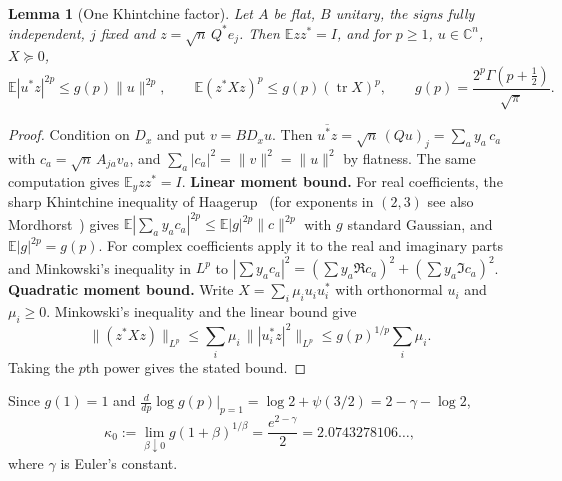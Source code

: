 \documentclass[11pt,a4paper]{article}
\newtheorem{lemma}[theorem]{Lemma}
\theoremstyle{definition}
\theoremstyle{remark}
\numberwithin{equation}{section}
\newcommand{\E}{\mathbb E}
\newcommand{\C}{\mathbb C}
\newcommand{\tr}{\operatorname{tr}}
\newcommand{\norm}[1]{\lVert#1\rVert}
\begin{document}
\begin{lemma}[One Khintchine factor]\label{lem:row}
Let $A$ be flat, $B$ unitary, the signs fully independent, $j$ fixed and
$z=\sqrt n\,Q^*e_j$. Then $\E zz^*=I$, and for $p\ge1$, $u\in\C^n$, $X\succeq0$,
\[
 \E|u^*z|^{2p}\le g(p)\norm u^{2p},\qquad \E(z^*Xz)^p\le g(p)(\tr X)^p,\qquad
 g(p)=\frac{2^p\Gamma(p+\frac12)}{\sqrt\pi}.
\]
\end{lemma}
\begin{proof}
Condition on $D_x$ and put $v=BD_xu$. Then
$\overline{u^*z}=\sqrt n\,(Qu)_j=\sum_a y_a\,c_a$ with $c_a=\sqrt n\,A_{ja}v_a$,
and $\sum_a|c_a|^2=\norm v^2=\norm u^2$ by flatness. The
same computation gives $\E_yzz^*=I$. \noindent\textbf{Linear moment bound.}\enspace
For real coefficients, the sharp
Khintchine inequality of Haagerup~\cite{Haagerup} (for exponents in $(2,3)$ see
also Mordhorst~\cite{Mordhorst}) gives
$\E|\sum_ay_ac_a|^{2p}\le\E|g|^{2p}\norm c^{2p}$ with $g$ standard Gaussian, and
$\E|g|^{2p}=g(p)$. For complex coefficients apply it to the real and imaginary
parts and Minkowski's inequality in $L^p$ to
$|\sum y_ac_a|^2=(\sum y_a\Re c_a)^2+(\sum y_a\Im c_a)^2$. \noindent\textbf{Quadratic moment bound.}\enspace
Write $X=\sum_i\mu_iu_iu_i^*$ with orthonormal $u_i$ and $\mu_i\ge0$.
Minkowski's inequality and the linear bound give
\[
 \|(z^*Xz)\|_{L^p}
 \le\sum_i\mu_i\,\||u_i^*z|^2\|_{L^p}
 \le g(p)^{1/p}\sum_i\mu_i.
\]
Taking the $p$th power gives the stated bound.
\end{proof}

Since $g(1)=1$ and $\frac{d}{dp}\log g(p)|_{p=1}=\log2+\psi(3/2)=2-\gamma-\log2$,
\begin{equation}\label{eq:kappa0}
 \kappa_0:=\lim_{\beta\downarrow0}g(1+\beta)^{1/\beta}=\frac{e^{2-\gamma}}2
 =2.0743278106\ldots,
\end{equation}
where $\gamma$ is Euler's constant.
\end{document}
